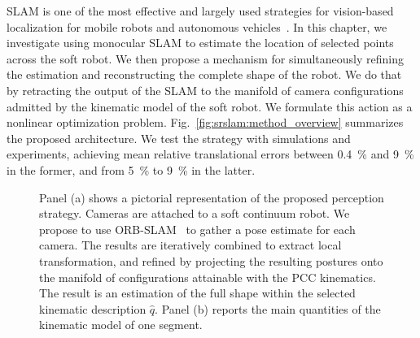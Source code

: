 \gls{SLAM} is one of the most effective and largely used strategies for vision-based localization for mobile robots and autonomous vehicles~\cite{fuentes2015visual,mur2017orb}. %
%
In this chapter, we investigate using monocular \gls{SLAM} to estimate the location of selected points across the soft robot. We then propose a mechanism for simultaneously refining the estimation and reconstructing the complete shape of the robot. We do that by retracting the output of the \gls{SLAM} to the manifold of camera configurations admitted by the kinematic model of the soft robot. We formulate this action as a nonlinear optimization problem. Fig.~\ref{fig:srslam:method_overview} summarizes the proposed architecture. We test the strategy with simulations and experiments, achieving mean relative translational errors between \SI{0.4}{\percent} and \SI{9}{\percent} in the former, and from \SI{5}{\percent} to \SI{9}{\percent} in the latter.

\begin{figure}[ht]
     \centering
     \caption{ Panel (a) shows a pictorial representation of the proposed perception strategy. Cameras are attached to a soft continuum robot. We propose to use ORB-SLAM~\cite{mur2017orb} to gather a pose estimate for each camera. The results are iteratively combined to extract local transformation, and refined by projecting the resulting postures onto the manifold of configurations attainable with the \gls{PCC} kinematics. The result is an estimation of the full shape within the selected kinematic description $\hat{q}$. Panel (b) reports the main quantities of the kinematic model of one segment. }
\end{figure}